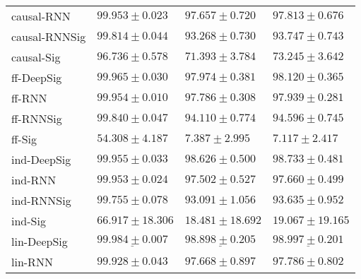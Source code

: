 \begin{tabular}{llll}
causal-RNN     &                           $ 99.953 \pm 0.023 $ &                           $ 97.657 \pm 0.720 $ &                           $ 97.813 \pm 0.676 $ \\
causal-RNNSig  &                           $ 99.814 \pm 0.044 $ &                           $ 93.268 \pm 0.730 $ &                           $ 93.747 \pm 0.743 $ \\
causal-Sig     &                           $ 96.736 \pm 0.578 $ &                           $ 71.393 \pm 3.784 $ &                           $ 73.245 \pm 3.642 $ \\
ff-DeepSig     &                           $ 99.965 \pm 0.030 $ &                           $ 97.974 \pm 0.381 $ &                           $ 98.120 \pm 0.365 $ \\
ff-RNN         &                           $ 99.954 \pm 0.010 $ &                           $ 97.786 \pm 0.308 $ &                           $ 97.939 \pm 0.281 $ \\
ff-RNNSig      &                           $ 99.840 \pm 0.047 $ &                           $ 94.110 \pm 0.774 $ &                           $ 94.596 \pm 0.745 $ \\
ff-Sig         &                           $ 54.308 \pm 4.187 $ &                            $ 7.387 \pm 2.995 $ &                            $ 7.117 \pm 2.417 $ \\
ind-DeepSig    &                           $ 99.955 \pm 0.033 $ &               $  \mathbf{ 98.626 \pm 0.500 } $ &               $  \mathbf{ 98.733 \pm 0.481 } $ \\
ind-RNN        &                           $ 99.953 \pm 0.024 $ &                           $ 97.502 \pm 0.527 $ &                           $ 97.660 \pm 0.499 $ \\
ind-RNNSig     &                           $ 99.755 \pm 0.078 $ &                           $ 93.091 \pm 1.056 $ &                           $ 93.635 \pm 0.952 $ \\
ind-Sig        &                          $ 66.917 \pm 18.306 $ &                          $ 18.481 \pm 18.692 $ &                          $ 19.067 \pm 19.165 $ \\
lin-DeepSig    &  $  \mathbf{ \underline{ 99.984 \pm 0.007 }} $ &  $  \mathbf{ \underline{ 98.898 \pm 0.205 }} $ &  $  \mathbf{ \underline{ 98.997 \pm 0.201 }} $ \\
lin-RNN        &                           $ 99.928 \pm 0.043 $ &                           $ 97.668 \pm 0.897 $ &                           $ 97.786 \pm 0.802 $ \\

\end{tabular}
